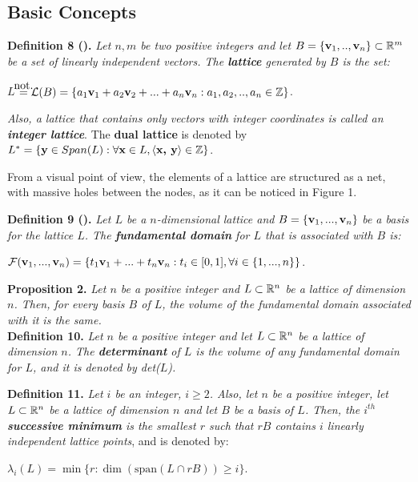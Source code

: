 \subsection{Basic Concepts}

\textbf{Definition 8 (\cite{HPS08}).} \textit{Let $n, m$ be two positive integers and let} $B = \{\textbf{v}_1, .., \textbf{v}_n\} \subset \mathbb{R}^m$ \textit{ be a set of linearly independent vectors. The \textbf{lattice} generated by $B$ is the set:}
\begin{center}
	$L$   $  \stackrel{\mathclap{\normalfont\mbox{not.}}}{=} \mathcal{L}(B) = \{a_1\vv_1 + a_2 \vv_2 +... + a_n\vv_n : a_1, a_2, ..,a_n \in \bZ\}$.
\end{center}

\textit{Also, a lattice that contains only vectors with integer coordinates is called an \textbf{integer lattice}}. The \textbf{dual lattice} is denoted by $L^* = \{\textbf{y} \in Span(L) : \forall \textbf{x} \in L, \langle\textbf{x, y}\rangle \in {\mathbb Z}\}$.


From a visual point of view, the elements of a lattice are structured as a net, with massive holes between the nodes, as it can be noticed in Figure 1.

\textbf{Definition 9 (\cite{HPS08}).} \textit{Let $L$ be a $n$-dimensional lattice and} $B = \{\textbf{v}_1,...,\textbf{v}_n\}$ \textit{be a basis for the lattice $L$. The \textbf{fundamental domain} for $L$ that is associated with $B$ is:}
\begin{center}
	$\mathcal{F}(\textbf{v}_1,...,\textbf{v}_n) = \{t_1\textbf{v}_1 + ...+ t_n\textbf{v}_n : t_i \in [0, 1], \forall i \in \{1,..., n\}\}$.
\end{center}


\begin{center}
	
\end{center}

\textbf{Proposition 2.} \textit{Let $n$ be a positive integer and $L \subset \mathbb{R}^n$ be a lattice of dimension $n$. Then, for every basis $B$ of $L$, the volume of the fundamental domain associated with it is the same.}\\

\textbf{Definition 10.} \textit{Let $n$ be a positive integer and let $L \subset \mathbb{R}^n$ be a lattice of dimension $n$. The \textbf{determinant} of $L$ is the volume of any fundamental domain for $L$, and it is denoted by det($L$).}

\textbf{Definition 11.} \textit{Let $i$ be an integer, $i \geq 2$. Also, let $n$ be a positive integer, let $L \subset \mathbb{R}^n$ be a lattice of dimension $n$ and let $B$ be a basis of $L$. Then, the $i^{th}$ \textbf{successive minimum} is the smallest $r$ such that $rB$ contains $i$ linearly independent lattice points}, and is denoted by:
\begin{center}
	$\lambda_i(L) = \displaystyle{\min}\{r:\dim(\text{span}(L \cap rB)) \geq i\}$.
\end{center}

